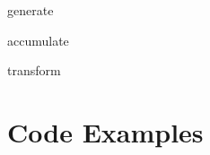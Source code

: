 \documentclass[notes]{beamer}
\begin{document}
\begin{frame}{generate}

\end{frame}

\begin{frame}{accumulate}

\end{frame}

\begin{frame}{transform}

\end{frame}

\section{Code Examples}

\end{document}
